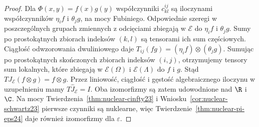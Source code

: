 \begin{proof}
Dla $\Phi(x,y)=f(x)g(y)$ współczynniki $c_{kl}^{ij}$
są iloczynami współczynników $\eta_i f$ i $\theta_j g$,
na mocy Fubiniego. Odpowiednie szeregi w poszczególnych grupach zmiennych
z odcięciami zbiegają w $\mathcal E$
do $\eta_i f$ i $\theta_j g$. Sumy po prostokątnych
zbiorach indeksów $(k,l)$ są tensorami ich sum
częściowych. Ciągłość odwzorowania dwuliniowego
daje $T_{ij}(fg)=(\eta_i f)\otimes(\theta_j g)$.
Sumując po prostokątnych skończonych zbiorach
indeksów $(i,j)$, otrzymujemy tensory sum lokalnych,
które zbiegają w $\mathcal E(\Omega)$ i
$\mathcal E(\Lambda)$ do $f$ i $g$.
Stąd $T J_{\mathcal E}(f\otimes g)=f\otimes g$.
Przez liniowość, ciągłość i gęstość algebraicznego
iloczynu w uzupełnieniu mamy $T\widehat J_{\mathcal E}=I$.
Oba izomorfizmy są zatem udowodnione nad $\R$ i $\C$.
Na mocy Twierdzenia~\ref{thm:nuclear-cinfty23}
i Wniosku~\ref{cor:nuclear-schwartz23} pierwsze
czynniki są nuklearne, więc
Twierdzenie~\ref{thm:nuclear-pi-eps24}
daje również izomorfizmy dla $\varepsilon$.
\end{proof}

